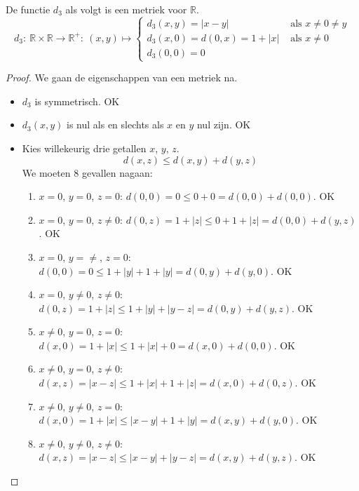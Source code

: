 \documentclass[main.tex]{subfiles}
\begin{document}
\begin{vb}
  De functie $d_{3}$ als volgt is een metriek voor $\mathbb{R}$.
  \[
  d_{3}:\ \mathbb{R} \times \mathbb{R} \rightarrow \mathbb{R}^{+}:\ (x,y) \mapsto
  \begin{cases}
    d_{3}(x,y) = |x-y| &\text{ als } x\neq 0 \neq y\\
    d_{3}(x,0) = d(0,x) = 1 + |x| &\text{ als } x \neq 0\\
    d_{3}(0,0) = 0
  \end{cases}
  \]

  \begin{proof}
    We gaan de eigenschappen van een metriek na.
    \begin{itemize}
    \item $d_{3}$ is symmetrisch. OK
    \item $d_{3}(x,y)$ is nul als en slechts als $x$ en $y$ nul zijn. OK
    \item Kies willekeurig drie getallen $x$, $y$, $z$.
      \[ d(x,z) \le d(x,y) + d(y,z) \]
      We moeten $8$ gevallen nagaan:
      \begin{enumerate}
      \item $x=0$, $y=0$, $z=0$: $d(0,0) = 0 \le 0 + 0 = d(0,0) + d(0,0)$. OK
      \item $x=0$, $y=0$, $z\neq0$: $d(0,z) = 1 + |z| \le 0 + 1 + |z| = d(0,0) + d(y,z)$. OK 
      \item $x=0$, $y=\neq$, $z=0$: $d(0,0) = 0 \le 1+|y| + 1+|y| = d(0,y) + d(y,0)$. OK
      \item $x=0$, $y\neq0$, $z\neq0$: $d(0,z) = 1+ |z| \le 1+|y| + |y-z| = d(0,y) + d(y,z)$. OK
      \item $x\neq0$, $y=0$, $z=0$: $d(x,0) = 1+|x| \le 1+|x| + 0 = d(x,0) + d(0,0)$. OK
      \item $x\neq0$, $y=0$, $z\neq0$: $d(x,z) = |x-z| \le 1+|x| + 1+|z| = d(x,0) + d(0,z)$. OK
      \item $x\neq0$, $y\neq0$, $z=0$: $d(x,0) = 1+|x| \le |x-y| + 1+|y| = d(x,y) + d(y,0)$. OK
      \item $x\neq0$, $y\neq0$, $z\neq0$: $d(x,z) = |x-z| \le |x-y| + |y-z| = d(x,y) + d(y,z)$. OK
      \end{enumerate}
    \end{itemize}
  \end{proof}
\end{vb}
\end{document}
